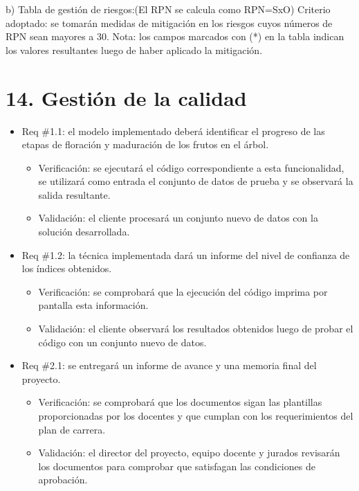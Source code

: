 \documentclass[
11pt, %
]{charter}
\begin{document}
b) Tabla de gestión de riesgos:(El RPN se calcula como RPN=SxO)
Criterio adoptado: se tomarán medidas de mitigación en los riesgos cuyos números de RPN sean
mayores a 30.
Nota: los campos marcados con (*) en la tabla indican los valores resultantes luego de haber
aplicado la mitigación.

\section{14. Gestión de la calidad}
\label{sec:calidad}


\begin{itemize} 
\item Req \#1.1: el modelo implementado deberá identificar el progreso de las etapas de floración y
maduración de los frutos en el árbol.

\begin{itemize}
	\item Verificación: se ejecutará el código correspondiente a esta funcionalidad,
    se utilizará como entrada el conjunto de datos de prueba y se observará la salida
    resultante.
	\item Validación: el cliente procesará un conjunto nuevo de datos con la solución desarrollada.
\end{itemize}

\item Req \#1.2: la técnica implementada dará un informe del nivel de confianza de los índices obtenidos.
\begin{itemize}
	\item Verificación: se comprobará que la ejecución del código imprima por pantalla esta información.
	\item Validación: el cliente observará los resultados obtenidos luego de probar el código con
    un conjunto nuevo de datos.
\end{itemize}

\item Req \#2.1: se entregará un informe de avance y una memoria final del proyecto.
\begin{itemize}
	\item Verificación: se comprobará que los documentos sigan las plantillas proporcionadas
    por los docentes y que cumplan con los requerimientos del plan de carrera.
	\item Validación: el director del proyecto, equipo docente y jurados revisarán los documentos para 
    comprobar que satisfagan las condiciones de aprobación.
\end{itemize}


\end{itemize}
\end{document}

